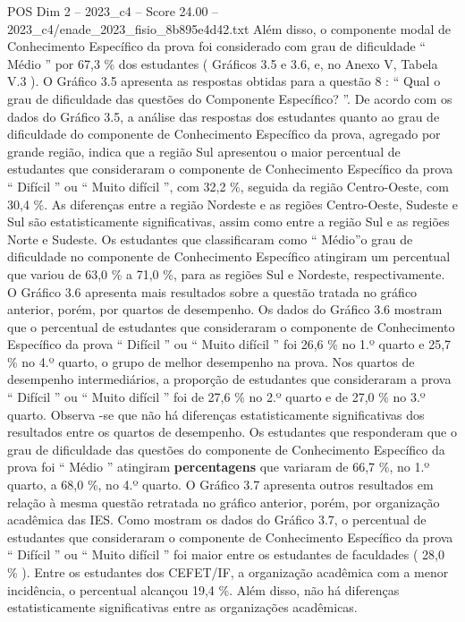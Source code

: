 \begin{textsample}{POS Dim 2 – 2023\_c4 – Score 24.00 – 2023\_c4/enade\_2023\_fisio\_8b895e4d42.txt}
Além disso, o componente modal de Conhecimento Específico da prova foi considerado com grau de dificuldade “ Médio ” por 67,3 \% dos estudantes ( Gráficos 3.5 e 3.6, e, no Anexo V, Tabela V.3 ).
O Gráfico 3.5 apresenta as respostas obtidas para a questão 8 : “ Qual o grau de dificuldade das questões do Componente Específico? ”.
De acordo com os dados do Gráfico 3.5, a análise das respostas dos estudantes quanto ao grau de dificuldade do componente de Conhecimento Específico da prova, agregado por grande região, indica que a região Sul apresentou o maior percentual de estudantes que consideraram o componente de Conhecimento Específico da prova “ Difícil ” ou “ Muito difícil ”, com 32,2 \%, seguida da região Centro-Oeste, com 30,4 \%.
As diferenças entre a região Nordeste e as regiões Centro-Oeste, Sudeste e Sul são estatisticamente significativas, assim como entre a região Sul e as regiões Norte e Sudeste.
Os estudantes que classificaram como “ Médio”o grau de dificuldade no componente de Conhecimento Específico atingiram um percentual que variou de 63,0 \% a 71,0 \%, para as regiões Sul e Nordeste, respectivamente.
O Gráfico 3.6 apresenta mais resultados sobre a questão tratada no gráfico anterior, porém, por quartos de desempenho.
Os dados do Gráfico 3.6 mostram que o percentual de estudantes que consideraram o componente de Conhecimento Específico da prova “ Difícil ” ou “ Muito difícil ” foi 26,6 \% no 1.º quarto e 25,7 \% no 4.º quarto, o grupo de melhor desempenho na prova.
Nos quartos de desempenho intermediários, a proporção de estudantes que consideraram a prova “ Difícil ” ou “ Muito difícil ” foi de 27,6 \% no 2.º quarto e de 27,0 \% no 3.º quarto.
Observa -se que não há diferenças estatisticamente significativas dos resultados entre os quartos de desempenho.
Os estudantes que responderam que o grau de dificuldade das questões do componente de Conhecimento Específico da prova foi “ Médio ” atingiram \textbf{percentagens} que variaram de 66,7 \%, no 1.º quarto, a 68,0 \%, no 4.º quarto.
O Gráfico 3.7 apresenta outros resultados em relação à mesma questão retratada no gráfico anterior, porém, por organização acadêmica das IES.
Como mostram os dados do Gráfico 3.7, o percentual de estudantes que consideraram o componente de Conhecimento Específico da prova “ Difícil ” ou “ Muito difícil ” foi maior entre os estudantes de faculdades ( 28,0 \% ).
Entre os estudantes dos CEFET/IF, a organização acadêmica com a menor incidência, o percentual alcançou 19,4 \%.
Além disso, não há diferenças estatisticamente significativas entre as organizações acadêmicas.

\end{textsample}
